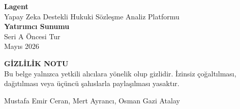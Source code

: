 \documentclass[12pt,a4paper]{article}
\begin{document}

\begin{titlepage}
  \thispagestyle{empty}

  \vspace*{1cm}
  \begin{center}
    {\color{white}\fontsize{48}{56}\selectfont\textbf{Lagent}}\\[0.3em]
    {\color{white!80!primary}\Large Yapay Zeka Destekli Hukuki Sözleşme Analiz Platformu}\\[3.5cm]

    {\color{dark}\fontsize{22}{28}\selectfont\textbf{Yatırımcı Sunumu}}\\[0.5em]
    {\color{muted}\large Seri A Öncesi Tur}\\[0.5em]
    {\color{muted}\large Mayıs 2026}

    \vfill
    \begin{mdframed}[backgroundcolor=light,linecolor=accent,linewidth=1pt,roundcorner=6pt]
      \centering
      {\small\color{muted}\textbf{GİZLİLİK NOTU}}\\[3pt]
      {\small\color{dark}Bu belge yalnızca yetkili alıcılara yönelik olup gizlidir.
      İzinsiz çoğaltılması, dağıtılması veya üçüncü şahıslarla paylaşılması yasaktır.}
    \end{mdframed}
    \vspace{1cm}
    {\color{muted}\normalsize Mustafa Emir Ceran, Mert Ayrancı, Osman Gazi Atalay}
  \end{center}
\end{titlepage}

\newpage
\setcounter{page}{1}
\onehalfspacing

\end{document}
